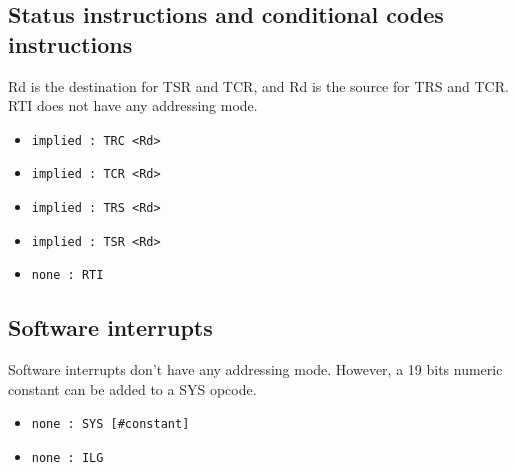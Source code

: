 \documentclass[11pt]{article}
\begin{document}
\subsection{Status instructions and conditional codes instructions}

Rd is the destination for TSR and TCR, and Rd is the source for TRS and TCR.
RTI does not have any addressing mode.
\begin{itemize}
    \item \texttt{implied : TRC <Rd>}
    \item \texttt{implied : TCR <Rd>}
    \item \texttt{implied : TRS <Rd>}
    \item \texttt{implied : TSR <Rd>}
    \item \texttt{none : RTI }
\end{itemize}

\subsection{Software interrupts}

Software interrupts don't have any addressing mode. 
However, a 19 bits numeric constant can be added to a SYS opcode. 
\begin{itemize}
    \item \texttt{none : SYS [\#constant]}
    \item \texttt{none : ILG }
\end{itemize}
\end{document}
